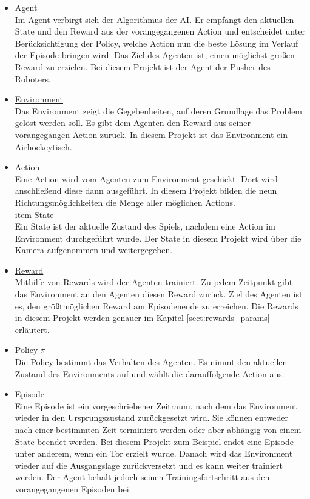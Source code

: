 \begin{itemize}
\item \underline{Agent} \\
Im Agent verbirgt sich der Algorithmus der AI. Er empfängt den aktuellen State und den Reward aus der vorangegangenen Action und entscheidet unter Berücksichtigung der Policy, welche Action nun die beste Lösung im Verlauf der Episode bringen wird. Das Ziel des Agenten ist, einen möglichst großen Reward zu erzielen. Bei diesem Projekt ist der Agent der Pusher des Roboters.
\item \underline{Environment} \\
Das Environment zeigt die Gegebenheiten, auf deren Grundlage das Problem gelöst werden soll. Es gibt dem Agenten den Reward aus seiner vorangegangen Action zurück. In diesem Projekt ist das Environment ein Airhockeytisch. 
\item \underline{Action} \\
Eine Action wird vom Agenten zum Environment geschickt. Dort wird anschließend diese dann ausgeführt. In diesem Projekt bilden die neun Richtungsmöglichkeiten die Menge aller möglichen Actions.
\\item \underline{State} \\
Ein State ist der aktuelle Zustand des Spiels, nachdem eine Action im Environment durchgeführt wurde. Der State in diesem Projekt wird über die Kamera aufgenommen und weitergegeben.
\item \underline{Reward} \\
Mithilfe von Rewards wird der Agenten trainiert. Zu jedem Zeitpunkt gibt das Environment an den Agenten diesen Reward zurück. Ziel des Agenten ist es, den größtmöglichen Reward am Episodenende zu erreichen. Die Rewards in diesem Projekt werden genauer im Kapitel \ref{sect:rewards_params} erläutert.
\item \underline{Policy $\pi$} \\
Die Policy  bestimmt das Verhalten des Agenten. Es nimmt den aktuellen Zustand des Environments auf und wählt die darauffolgende Action aus. 
\item \underline{Episode} \\
Eine Episode ist ein vorgeschriebener Zeitraum, nach dem das Environment wieder in den Ursprungszustand zurückgesetzt wird. Sie können entweder nach einer bestimmten Zeit terminiert werden oder aber abhängig von einem State beendet werden. Bei diesem Projekt zum Beispiel endet eine Episode unter anderem, wenn ein Tor erzielt wurde. Danach wird das Environment wieder auf die Ausgangslage zurückversetzt und es kann weiter trainiert werden. Der Agent behält jedoch seinen Trainingsfortschritt aus den vorangegangenen Episoden bei.
\end{itemize}


